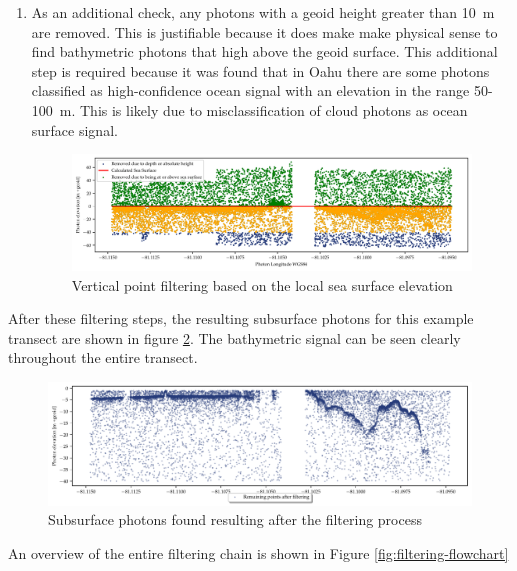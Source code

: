 \begin{enumerate}
    The results of steps 2-4 are shown in figure \ref{fig:vert_filtering}
    
    \item As an additional check, any photons with a geoid height greater than 10~m are removed. This is justifiable because it does make make physical sense to find bathymetric photons that high above the geoid surface. This additional step is required because it was found that in Oahu there are some photons classified as high-confidence ocean signal with an elevation in the range 50-100~m. This is likely due to misclassification of cloud photons as ocean surface signal.
    
    
    \begin{figure}[htb]
        \centering
        \includegraphics[width=\textwidth]{figures/methodology_sealvl_filtering.pdf}
        \caption{Vertical point filtering based on the local sea surface elevation}
        \label{fig:vert_filtering}
    \end{figure}
\end{enumerate}

After these filtering steps, the resulting subsurface photons for this example transect are shown in figure \ref{fig:remaing_photons}. The bathymetric signal can be seen clearly throughout the entire transect.

\begin{figure}[htb]
    \centering
    \includegraphics[width=\textwidth]{figures/methodology_reminaing_after_filtering.pdf}
    \caption{Subsurface photons found resulting after the filtering process}
    \label{fig:remaing_photons}
\end{figure}

An overview of the entire filtering chain is shown in Figure \ref{fig:filtering-flowchart} 

